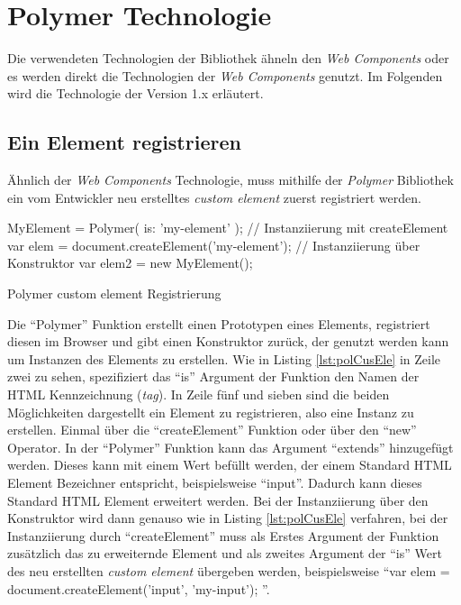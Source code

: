 \documentclass[12pt, paper=a4, bibtotoc, toc=listof, headsepline=true]{scrreprt}
\begin{document}
	\section{Polymer Technologie} Die verwendeten Technologien der Bibliothek ähneln den \emph{Web Components} oder es werden direkt die Technologien der \emph{Web Components} genutzt. Im Folgenden wird die Technologie der Version 1.x erläutert.
		\subsection{Ein Element registrieren}
		Ähnlich der \emph{Web Components} Technologie, muss mithilfe der \emph{Polymer} Bibliothek ein vom Entwickler neu erstelltes \emph{custom element} zuerst registriert werden. 
		\begin{listing}
		\begin{JavaScriptcode*}{}
	MyElement = Polymer({
	   is: 'my-element'
	});
	// Instanziierung mit createElement
	var elem = document.createElement('my-element');
	// Instanziierung über Konstruktor
	var elem2 = new MyElement();
		\end{JavaScriptcode*}
		\caption{Polymer custom element Registrierung}
		\label{lst:polCusEle}
		\end{listing}
Die \enquote{Polymer} Funktion erstellt einen Prototypen eines Elements, registriert diesen im Browser und gibt einen Konstruktor zurück, der genutzt werden kann um Instanzen des Elements zu erstellen. Wie in Listing \ref{lst:polCusEle} in Zeile zwei zu sehen, spezifiziert das \enquote{is} Argument der Funktion den Namen der \ac{HTML} Kennzeichnung (\emph{tag}). In Zeile fünf und sieben sind die beiden Möglichkeiten dargestellt ein Element zu registrieren, also eine Instanz zu erstellen. Einmal über die \enquote{createElement} Funktion oder über den \enquote{new} Operator. In der \enquote{Polymer} Funktion kann das Argument \enquote{extends} hinzugefügt werden. Dieses kann mit einem Wert befüllt werden, der einem Standard \ac{HTML} Element Bezeichner entspricht, beispielsweise \enquote{input}. Dadurch kann dieses Standard \ac{HTML} Element erweitert werden. Bei der Instanziierung über den Konstruktor wird dann genauso wie in Listing \ref{lst:polCusEle} verfahren, bei der Instanziierung durch \enquote{createElement} muss als Erstes Argument der Funktion zusätzlich das zu erweiternde Element und als zweites Argument der \enquote{is} Wert des neu erstellten \emph{custom element} übergeben werden, beispielsweise \enquote{var elem = document.createElement('input', 'my-input');
}\cite{polyReg}.
\end{document}
